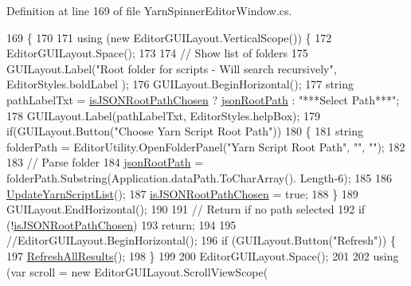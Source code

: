 Definition at line 169 of file Yarn\-Spinner\-Editor\-Window.\-cs.


\begin{DoxyCode}
169                      \{
170 
171             \textcolor{keyword}{using} (\textcolor{keyword}{new} EditorGUILayout.VerticalScope()) \{
172                 EditorGUILayout.Space();
173 
174                 \textcolor{comment}{// Show list of folders}
175                 GUILayout.Label(\textcolor{stringliteral}{"Root folder for scripts - Will search recursively"}, EditorStyles.boldLabel
      );
176                 GUILayout.BeginHorizontal();
177                 \textcolor{keywordtype}{string} pathLabelTxt = \hyperlink{a00164_a85f1c10b20b04052269b0ee2fb71c5af}{isJSONRootPathChosen} ? 
      \hyperlink{a00164_a7599a00e246791ee46a5c549a05975f3}{jsonRootPath} : \textcolor{stringliteral}{"***Select Path***"};
178                 GUILayout.Label(pathLabelTxt, EditorStyles.helpBox);
179                 \textcolor{keywordflow}{if}(GUILayout.Button(\textcolor{stringliteral}{"Choose Yarn Script Root Path"}))
180                 \{
181                     \textcolor{keywordtype}{string} folderPath = EditorUtility.OpenFolderPanel(\textcolor{stringliteral}{"Yarn Script Root Path"}, \textcolor{stringliteral}{""}, \textcolor{stringliteral}{""});
182 
183                     \textcolor{comment}{// Parse folder}
184                     \hyperlink{a00164_a7599a00e246791ee46a5c549a05975f3}{jsonRootPath} = folderPath.Substring(Application.dataPath.ToCharArray().
      Length-6);                    
185                     
186                     \hyperlink{a00164_a406febf62d77eaabc235f6316e537345}{UpdateYarnScriptList}();
187                     \hyperlink{a00164_a85f1c10b20b04052269b0ee2fb71c5af}{isJSONRootPathChosen} = \textcolor{keyword}{true};                    
188                 \}
189                 GUILayout.EndHorizontal();
190 
191                 \textcolor{comment}{// Return if no path selected}
192                 \textcolor{keywordflow}{if} (!\hyperlink{a00164_a85f1c10b20b04052269b0ee2fb71c5af}{isJSONRootPathChosen})
193                     \textcolor{keywordflow}{return};
194 
195                 \textcolor{comment}{//EditorGUILayout.BeginHorizontal();}
196                 \textcolor{keywordflow}{if} (GUILayout.Button(\textcolor{stringliteral}{"Refresh"})) \{
197                     \hyperlink{a00164_ae4faac1a6b0cc9710b20267dc4b88995}{RefreshAllResults}();
198                 \}
199                 
200                 EditorGUILayout.Space();
201 
202                 \textcolor{keyword}{using} (var scroll = \textcolor{keyword}{new} EditorGUILayout.ScrollViewScope(

\end{DoxyCode}
